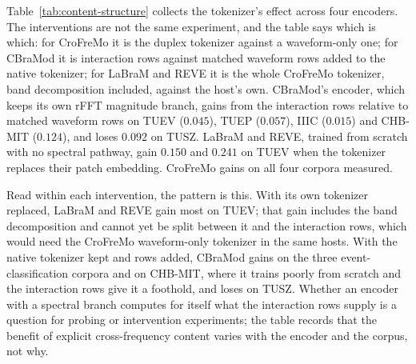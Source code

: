 Table~\ref{tab:content-structure} collects the tokenizer's effect across
four encoders. The interventions are not the same experiment, and the
table says which is which: for CroFreMo it is the duplex tokenizer against
a waveform-only one; for CBraMod it is interaction rows against matched
waveform rows added to the native tokenizer; for LaBraM and REVE it is the
whole CroFreMo tokenizer, band decomposition included, against the host's
own. CBraMod's encoder, which keeps its own rFFT magnitude branch, gains from
the interaction rows relative to matched waveform rows on TUEV ($0.045$),
TUEP ($0.057$), IIIC ($0.015$) and CHB-MIT ($0.124$), and loses $0.092$ on
TUSZ. LaBraM and REVE, trained from scratch with no spectral pathway,
gain $0.150$ and $0.241$ on TUEV when the tokenizer replaces their patch
embedding. CroFreMo gains on all four corpora measured.

\begin{table}[t]
\centering
\small
\caption{Tokenizer benefit across four encoders. The interventions differ
and the numbers are not one quantity: duplex vs.\ waveform-only tokenizer
(CroFreMo); interaction rows vs.\ matched waveform rows added to the
native tokenizer (CBraMod); the whole CroFreMo tokenizer vs.\ the native
tokenizer (LaBraM, REVE). Single seeds.}
\label{tab:content-structure}
\end{table}

Read within each intervention, the pattern is this. With its own
tokenizer replaced, LaBraM and REVE gain most on TUEV; that gain includes
the band decomposition and cannot yet be split between it and the
interaction rows, which would need the CroFreMo waveform-only tokenizer
in the same hosts. With the native tokenizer kept and rows added, CBraMod
gains on the three event-classification corpora and on CHB-MIT, where it
trains poorly from scratch and the interaction rows give it a foothold,
and loses on TUSZ. Whether an encoder with a spectral branch computes for
itself what the interaction rows supply is a question for probing or
intervention experiments; the table records that the benefit of explicit
cross-frequency content varies with the encoder and the corpus, not why.

